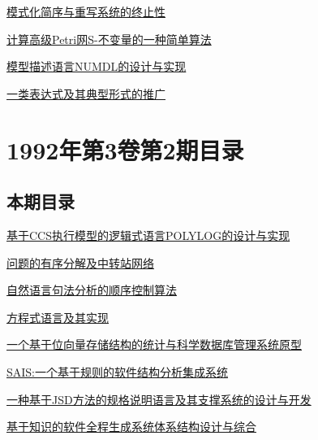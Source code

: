 \documentclass[a4paper]{article}
\begin{document}
\href{http://www.jos.org.cn/ch/reader/download_pdf.aspx?file_no=19920306&year_id=1992&quarter_id=3&falg=1}{模式化简序与重写系统的终止性}

\href{http://www.jos.org.cn/ch/reader/download_pdf.aspx?file_no=19920307&year_id=1992&quarter_id=3&falg=1}{计算高级Petri网S-不变量的一种简单算法}

\href{http://www.jos.org.cn/ch/reader/download_pdf.aspx?file_no=19920308&year_id=1992&quarter_id=3&falg=1}{模型描述语言NUMDL的设计与实现}

\href{http://www.jos.org.cn/ch/reader/download_pdf.aspx?file_no=19920309&year_id=1992&quarter_id=3&falg=1}{一类表达式及其典型形式的推广}


\section{\textbf{1992年第3卷第2期目录}}
\subsection{本期目录}
\href{http://www.jos.org.cn/ch/reader/download_pdf.aspx?file_no=19920201&year_id=1992&quarter_id=2&falg=1}{基于CCS执行模型的逻辑式语言POLYLOG的设计与实现}

\href{http://www.jos.org.cn/ch/reader/download_pdf.aspx?file_no=19920202&year_id=1992&quarter_id=2&falg=1}{问题的有序分解及中转站网络}

\href{http://www.jos.org.cn/ch/reader/download_pdf.aspx?file_no=19920203&year_id=1992&quarter_id=2&falg=1}{自然语言句法分析的顺序控制算法}

\href{http://www.jos.org.cn/ch/reader/download_pdf.aspx?file_no=19920204&year_id=1992&quarter_id=2&falg=1}{方程式语言及其实现}

\href{http://www.jos.org.cn/ch/reader/download_pdf.aspx?file_no=19920205&year_id=1992&quarter_id=2&falg=1}{一个基于位向量存储结构的统计与科学数据库管理系统原型}

\href{http://www.jos.org.cn/ch/reader/download_pdf.aspx?file_no=19920206&year_id=1992&quarter_id=2&falg=1}{SAIS:一个基于规则的软件结构分析集成系统}

\href{http://www.jos.org.cn/ch/reader/download_pdf.aspx?file_no=19920207&year_id=1992&quarter_id=2&falg=1}{一种基于JSD方法的规格说明语言及其支撑系统的设计与开发}

\href{http://www.jos.org.cn/ch/reader/download_pdf.aspx?file_no=19920208&year_id=1992&quarter_id=2&falg=1}{基于知识的软件全程生成系统体系结构设计与综合}
\end{document}
